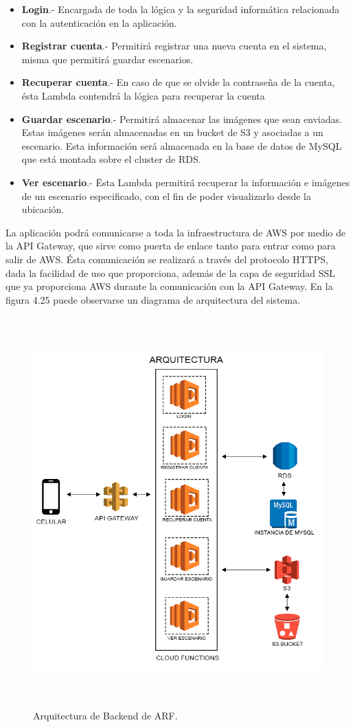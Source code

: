 \begin{itemize}
	\item\textbf{Login}.- Encargada de toda la lógica y la seguridad informática relacionada con la autenticación en la aplicación.
	\item\textbf{Registrar cuenta}.- Permitirá registrar una nueva cuenta en el sistema, misma que permitirá guardar escenarios.
	\item\textbf{Recuperar cuenta}.- En caso de que se olvide la contraseña de la cuenta, ésta Lambda contendrá la lógica para recuperar la cuenta
	\item\textbf{Guardar escenario}.- Permitirá almacenar las imágenes que sean enviadas. Estas imágenes serán almacenadas en un bucket de S3 y asociadas a un escenario. Esta información será almacenada en la base de datos de MySQL que está montada sobre el cluster de RDS.
	\item\textbf{Ver escenario}.- Ësta Lambda permitirá recuperar la información e imágenes de un escenario especificado, con el fin de poder visualizarlo desde la ubicación.
\end{itemize}
\noindent
La aplicación podrá comunicarse a toda la infraestructura de AWS por medio de la API Gateway, que sirve como puerta de enlace tanto para entrar como para salir de AWS. Ésta comunicación se realizará a través del protocolo HTTPS, dada la facilidad de uso que proporciona, además de la capa de seguridad SSL que ya proporciona AWS durante la comunicación con la API Gateway. En la figura 4.25 puede observarse un diagrama de arquitectura del sistema.
\begin{figure}[H]
	\centering
	\includegraphics[width=15cm,height=15cm]{imagenes/desarrollo/arquitectura/ArchitecturaBackend.png}
	\caption{Arquitectura de Backend de ARF.}
	\label{fig:arqbackend}
\end{figure}
